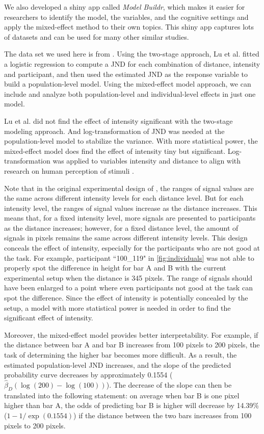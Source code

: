 We also developed a shiny app called \textit{Model Buildr}, which makes it easier for researchers to identify the model, the variables, and the cognitive settings and apply the mixed-effect method to their own topics. This shiny app captures lots of datasets and can be used for many other similar studies.

The data set we used here is from \cite{JNDVIS21}. Using the two-stage approach, Lu et al. \cite{JNDVIS21} fitted a logistic regression to compute a JND for each combination of distance, intensity and participant, and then used the estimated JND as the response variable to build a population-level model.
Using the mixed-effect model approach, we can include and analyze both population-level and individual-level effects in just one model.  

Lu et al. did not find the effect of intensity significant with the two-stage modeling approach. And log-transformation of JND was needed at the population-level model to stabilize the variance. 
With more statistical power, the mixed-effect model does find the effect of intensity tiny but significant. Log-transformation was applied to variables intensity and distance to align with research on human perception of stimuli \cite{logPerception}.

Note that in the original experimental design of \cite{JNDVIS21}, the ranges of signal values are the same across different intensity levels for each distance level. But for each intensity level, the ranges of signal values increase as the distance increases. This means that, for a fixed intensity level, more signals are presented to participants as the distance increases; however, for a fixed distance level, the amount of signals in pixels remains the same across different intensity levels. This design conceals the effect of intensity, especially for the participants who are not good at the task.
For example, participant ``100\_119" in \autoref{fig:individuals} was not able to properly spot the difference in height for bar A and B with the current experimental setup when the distance is 345 pixels. The range of signals should have been enlarged to a point where even participants not good at the task can spot the difference. Since the effect of intensity is potentially concealed by the setup, a model with more statistical power is needed in order to find the significant effect of intensity.

Moreover, the mixed-effect model provides better interpretability. For example, if the distance between bar A and bar B increases from 100 pixels to 200 pixels, the task of determining the higher bar becomes more difficult. As a result, the estimated population-level JND increases, and the slope of the predicted probability curve decreases by approximately 0.1554 ($\hat{\beta}_D (\log(200) - \log(100))$). The decrease of the slope can then be translated into the following statement: on average when bar B is one pixel higher than bar A, the odds of predicting bar B is higher will decrease by 14.39\% ($1 - 1 / \exp(0.1554)$) if the distance between the two bars increases from 100 pixels to 200 pixels.

